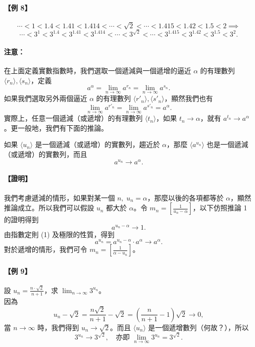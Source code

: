 \paragraph{【例 8】}
\[
\cdots < 1 < 1.4 < 1.41 < 1.414 < \cdots < \sqrt{2} < \cdots < 1.415 < 1.42 < 1.5 < 2 \implies
\]
\[
\cdots < 3^1 < 3^{1.4} < 3^{1.41} < 3^{1.414} < \cdots < 3^{\sqrt{2}} < \cdots < 3^{1.415} < 3^{1.42} < 3^{1.5} < 3^2.
\]

\paragraph{注意：} 在上面定義實數指數時，我們選取一個遞減與一個遞增的逼近 $\alpha$ 的有理數列 $\langle r_n \rangle, \langle s_n \rangle$，定義
\[
a^\alpha = \lim_{n\to\infty} a^{r_n} = \lim_{n\to\infty} a^{s_n}.
\]
如果我們選取另外兩個逼近 $\alpha$ 的有理數列 $\langle r'_n \rangle, \langle s'_n \rangle$，顯然我們也有
\[
\lim_{n\to\infty} a^{r'_n} = \lim_{n\to\infty} a^{s'_n} = a^\alpha.
\]
實際上，任意一個遞減（或遞增）的有理數列 $\langle t_n \rangle$，如果 $t_n \to \alpha$，就有 $a^{t_n} \to a^\alpha$。更一般地，我們有下面的推論。

\begin{prop}[推論 2]
如果 $\langle u_n \rangle$ 是一個遞減（或遞增）的實數列，趨近於 $\alpha$，那麼 $\langle a^{u_n} \rangle$ 也是一個遞減（或遞增）的實數列，而且
\[
a^{u_n} \longrightarrow a^\alpha.
\]
\end{prop}
\paragraph{【證明】} 我們考慮遞減的情形，如果對某一個 $n,\; u_n = \alpha$，那麼以後的各項都等於 $\alpha$，顯然推論成立。所以我們可以假設 $u_n$ 都大於 $\alpha$。令 $m_n = [\frac{1}{u_n - \alpha}]$，以下仿照推論 1 的證明得到
\[
a^{u_n - \alpha} \longrightarrow 1.
\]
由指數定則 (1) 及極限的性質，得到
\[
a^{u_n} = a^{u_n - \alpha} \cdot a^\alpha \longrightarrow a^\alpha.
\]
對於遞增的情形，我們可令 $m_n = [\frac{1}{\alpha - u_n}]$。

\paragraph{【例 9】} 設 $u_n = \frac{n \cdot \sqrt{2}}{n+1}$，求 $\lim_{n\to\infty} 3^{u_n}$。\\
因為
\[
u_n - \sqrt{2} = \frac{n\sqrt{2}}{n+1} - \sqrt{2} = \left(\frac{n}{n+1}-1\right)\sqrt{2} \longrightarrow 0,
\]
當 $n \to \infty$ 時，我們得到 $u_n \to \sqrt{2}$。而且 $\langle u_n \rangle$ 是一個遞增數列（何故？），所以
\[
3^{u_n} \longrightarrow 3^{\sqrt{2}}, \quad \text{亦即 } \lim_{n\to\infty} 3^{u_n} = 3^{\sqrt{2}}.
\]

